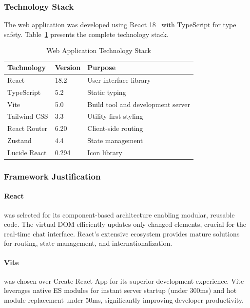 \subsubsection{Technology Stack}

The web application was developed using React 18~\cite{react} with TypeScript for type safety. Table~\ref{tab:web-stack} presents the complete technology stack.

\begin{table}[h]
\centering
\caption{Web Application Technology Stack}
\label{tab:web-stack}
\begin{tabular}{@{}lll@{}}
\toprule
Technology & Version & Purpose \\
\midrule
React & 18.2 & User interface library \\
TypeScript & 5.2 & Static typing \\
Vite & 5.0 & Build tool and development server \\
Tailwind CSS & 3.3 & Utility-first styling \\
React Router & 6.20 & Client-side routing \\
Zustand & 4.4 & State management \\
Lucide React & 0.294 & Icon library \\
\bottomrule
\end{tabular}
\end{table}

\subsubsection{Framework Justification}

\paragraph{React} was selected for its component-based architecture enabling modular, reusable code. The virtual DOM efficiently updates only changed elements, crucial for the real-time chat interface. React's extensive ecosystem provides mature solutions for routing, state management, and internationalization.

\paragraph{Vite} was chosen over Create React App for its superior development experience. Vite leverages native ES modules for instant server startup (under 300ms) and hot module replacement under 50ms, significantly improving developer productivity.

